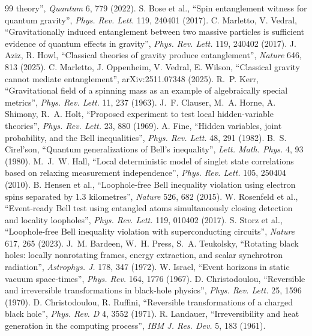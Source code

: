 \documentclass[11pt,a4paper]{article}
\theoremstyle{definition}
\theoremstyle{remark}
\begin{document}
\begin{thebibliography}{99}
theory'', \emph{Quantum} 6, 779 (2022).
 S. Bose et al., ``Spin entanglement witness for quantum gravity'', \emph{Phys. Rev. Lett.} 119, 240401 (2017).
 C. Marletto, V. Vedral, ``Gravitationally induced entanglement between two massive particles is sufficient evidence of
quantum effects in gravity'', \emph{Phys. Rev. Lett.} 119, 240402 (2017).
 J. Aziz, R. Howl, ``Classical theories of gravity produce entanglement'', \emph{Nature} 646, 813 (2025).
 C. Marletto, J. Oppenheim, V. Vedral, E. Wilson, ``Classical gravity cannot mediate entanglement'', arXiv:2511.07348
(2025).
 R.~P. Kerr, ``Gravitational field of a spinning mass as an example of algebraically special metrics'', \emph{Phys. Rev.
Lett.} 11, 237 (1963).
 J.~F. Clauser, M.~A. Horne, A. Shimony, R.~A. Holt, ``Proposed experiment to test local hidden-variable theories'',
\emph{Phys. Rev. Lett.} 23, 880 (1969).
 A. Fine, ``Hidden variables, joint probability, and the Bell inequalities'', \emph{Phys. Rev. Lett.} 48, 291 (1982).
 B.~S. Cirel'son, ``Quantum generalizations of Bell's inequality'', \emph{Lett. Math. Phys.} 4, 93 (1980).
 M.~J.~W. Hall, ``Local deterministic model of singlet state correlations based on relaxing measurement independence'',
\emph{Phys. Rev. Lett.} 105, 250404 (2010).
 B. Hensen et al., ``Loophole-free Bell inequality violation using electron spins separated by 1.3 kilometres'',
\emph{Nature} 526, 682 (2015).
 W. Rosenfeld et al., ``Event-ready Bell test using entangled atoms simultaneously closing detection and locality
loopholes'', \emph{Phys. Rev. Lett.} 119, 010402 (2017).
 S. Storz et al., ``Loophole-free Bell inequality violation with superconducting circuits'', \emph{Nature} 617, 265 (2023).
 J.~M. Bardeen, W.~H. Press, S.~A. Teukolsky, ``Rotating black holes: locally nonrotating frames, energy extraction, and
scalar synchrotron radiation'', \emph{Astrophys. J.} 178, 347 (1972).
 W. Israel, ``Event horizons in static vacuum space-times'', \emph{Phys. Rev.} 164, 1776 (1967).
 D. Christodoulou, ``Reversible and irreversible transformations in black-hole physics'', \emph{Phys. Rev. Lett.}
25, 1596 (1970).
 D. Christodoulou, R. Ruffini, ``Reversible transformations of a charged black hole'', \emph{Phys. Rev. D} 4, 3552 (1971).
 R. Landauer, ``Irreversibility and heat generation in the computing process'', \emph{IBM J. Res. Dev.} 5, 183 (1961).

\end{thebibliography}
\end{document}

